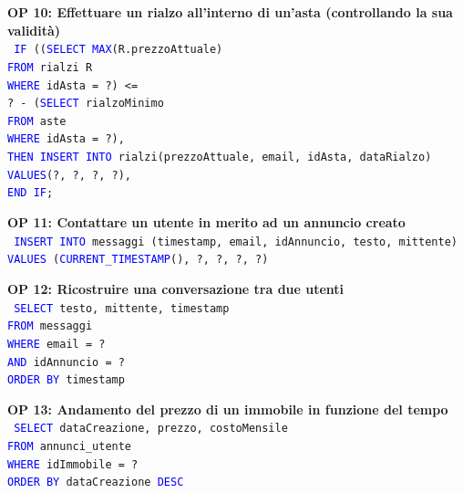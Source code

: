 \documentclass[a4paper,12pt]{report}
\begin{document}
            \noindent
            \textbf{OP 10: Effettuare un rialzo all’interno di un’asta (controllando la sua validità)} \\
            \texttt{
                \textcolor{blue}{IF} ((\textcolor{blue}{SELECT MAX}(R.prezzoAttuale) \\
                    \null\qquad \textcolor{blue}{FROM} rialzi R\\
                    \null\qquad \textcolor{blue}{WHERE} idAsta = ?) <= \\
                    \null\qquad ? - (\textcolor{blue}{SELECT} rialzoMinimo \\
                    \null\qquad \textcolor{blue}{FROM} aste \\
                    \null\qquad \textcolor{blue}{WHERE} idAsta = ?), \\
                \textcolor{blue}{THEN INSERT INTO} rialzi(prezzoAttuale, email, idAsta, dataRialzo) \\
                \textcolor{blue}{VALUES}(?, ?, ?, ?), \\ 
                \textcolor{blue}{END IF}; \\
            }       
            
            \noindent
            \textbf{OP 11: Contattare un utente in merito ad un annuncio creato} \\
            \texttt{
                \textcolor{blue}{INSERT INTO} messaggi (timestamp, email, idAnnuncio, testo, mittente) \\
                \textcolor{blue}{VALUES} (\textcolor{blue}{CURRENT\_TIMESTAMP}(), ?, ?, ?, ?) \\
            } 

            \noindent
            \textbf{OP 12: Ricostruire una conversazione tra due utenti} \\
            \texttt{
                \textcolor{blue}{SELECT} testo, mittente, timestamp \\
                \textcolor{blue}{FROM} messaggi \\
                \textcolor{blue}{WHERE} email = ? \\
                \textcolor{blue}{AND} idAnnuncio = ? \\
                \textcolor{blue}{ORDER BY} timestamp \\
            }

            \noindent
            \textbf{OP 13: Andamento del prezzo di un immobile in funzione del tempo} \\
            \texttt{
                \textcolor{blue}{SELECT} dataCreazione, prezzo, costoMensile \\
                \textcolor{blue}{FROM} annunci\_utente \\
                \textcolor{blue}{WHERE} idImmobile = ? \\
                \textcolor{blue}{ORDER BY} dataCreazione \textcolor{blue}{DESC} \\
            }
            
\end{document}
